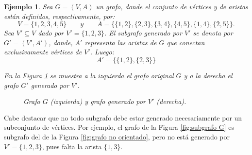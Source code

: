 \documentclass[11pt,a4paper,spanish]{report}
\theoremstyle{plain}
\newtheorem{ejemplo}{Ejemplo}[chapter]
\begin{document}
\begin{ejemplo}
Sea $G = (V, A)$ un grafo, donde el conjunto de vértices y de aristas están definidos, respectivamente, por:
\[
V = \{1, 2, 3, 4, 5\} \qquad y \qquad
A = \{\{1,2\}, \{2,3\}, \{3,4\}, \{4,5\}, \{1,4\}, \{2,5\}\}.
\]
Sea $V'\subseteq V$ dado por $V' = \{1, 2, 3\}$. El subgrafo generado por $V'$ se denota por $G' = (V', A')$, donde, $A'$ representa las aristas de $G$ que conectan exclusivamente vértices de $V'$. Luego:
\[
A' = \{\{1,2\}, \{2,3\}\}
\]

En la Figura \ref{fig:grafo-generado-subfigure} se muestra a la izquierda el grafo original $G$ y a la derecha el grafo $G'$ generado por $V'$.

\begin{figure}[H]
\centering
\begin{minipage}{0.45\textwidth}
    \centering
\end{minipage}
\hspace{0.5cm} %
\begin{minipage}{0.45\textwidth}
    \centering
\end{minipage}
\caption{Grafo $G$ (izquierda) y grafo generado por $V'$ (derecha).}
\label{fig:grafo-generado-subfigure}
\end{figure}
\end{ejemplo}



Cabe destacar que no todo subgrafo debe estar generado necesariamente por un subconjunto de vértices. Por ejemplo, el grafo de la Figura \ref{fig:subgrafo G} es subgrafo del de la Figura \ref{fig:grafo no orientado}, pero no está generado por $V'=\{1,2,3\}$, pues falta la arista $\{1,3\}$.
\end{document}
